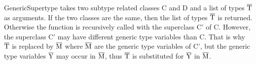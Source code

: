 GenericSupertype takes two subtype related classes C and D and a list of types $\overline{\text{T}}$ as arguments. If the two classes are the same, then the list of types $\overline{\text{T}}$ is returned. Otherwise the function is recursively called with the superclass C' of C.
However, the superclass C' may have different generic type variables than C. That is why $\overline{\text{T}}$ is replaced by $\overline{\text{M}}$ where $\overline{\text{M}}$ are the generic type variables of C', but the generic type variables $\overline{\text{Y}}$ may occur in $\overline{\text{M}}$, thus $\overline{\text{T}}$ is substituted for $\overline{\text{Y}}$ in $\overline{\text{M}}$.

